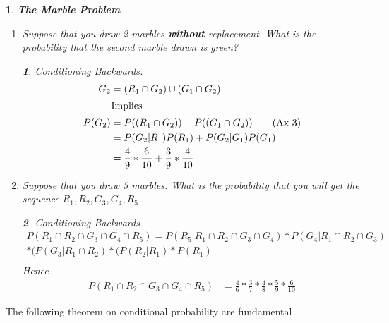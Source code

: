 \documentclass[11pt]{article}
\newtheorem*{solution}{\framebox{Sol}}
\newtheorem{example}{\framebox{Ex}}[section]
\newcommand\tab[1][1cm]{\hspace*{#1}}
\begin{document}
                \begin{example}
                    \textbf{The Marble Problem} \\
                    \begin{enumerate}
                        \item Suppose that you draw 2 marbles \textbf{without} replacement. What is the probability that the second marble drawn is green?
                            \begin{solution} Conditioning Backwards. \\
                                \begin{align*}
                                    G_2     &= (R_1 \cap G_2) \cup (G_1 \cap G_2) \\
                                    \intertext{\tab Implies}
                                    P(G_2)  &= P((R_1 \cap G_2) ) + P((G_1 \cap G_2) ) \tag{Ax 3} \\
                                            &= P(G_2|R_1)P(R_1) + P(G_2|G_1) P(G_1) \\
                                            &= \frac{4}{9} * \frac{6}{10} + \frac{3}{9}* \frac{4}{10}
                                \end{align*}
                            \end{solution}
                        \item Suppose that you draw 5 marbles. What is the probability that you will get the sequence $R_1, R_2, G_3, G_4, R_5$.
                            \begin{solution} Conditioning Backwards
                                \begin{multline*}
                                    P(R_1 \cap R_2 \cap G_3 \cap G_4 \cap R_5)  = P (R_5 | R_1 \cap R_2 \cap G_3 \cap G_4 ) 
                                                                                    * P(G_4 |R_1 \cap R_2 \cap G_3 )\\
                                                                                        * (P(G_3|R_1 \cap R_2)
                                                                                            *(P(R_2 |R_1)*P(R_1)\\
                                \end{multline*}
                                Hence 
                                \begin{align*}
                                    P(R_1 \cap R_2 \cap G_3 \cap G_4 \cap R_5)  &= \frac{4}{6}* \frac{3}{7}* \frac{4}{8}* \frac{5}{9} *\frac{6}{10}
                                \end{align*}
                            \end{solution}
                    \end{enumerate}
                \end{example}
                The following theorem on conditional probability are fundamental 
\end{document}
